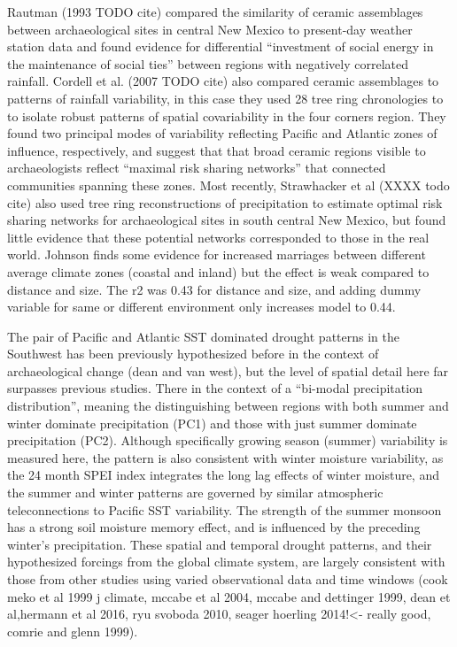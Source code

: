 \documentclass[11pt]{wlscirep}
\begin{document}
Rautman (1993 TODO cite) compared the similarity of ceramic assemblages between archaeological sites in central New Mexico to present-day weather station data and found evidence for differential ``investment of social energy in the maintenance of social ties'' between regions with negatively correlated rainfall. Cordell et al. (2007 TODO cite) also compared ceramic assemblages to patterns of rainfall variability, in this case they used 28 tree ring chronologies to to isolate robust patterns of spatial covariability in the four corners region. They found two principal modes of variability reflecting Pacific and Atlantic zones of influence, respectively, and suggest that that broad ceramic regions visible to archaeologists reflect ``maximal risk sharing networks'' that connected communities spanning these zones. Most recently, Strawhacker et al (XXXX todo cite) also used tree ring reconstructions of precipitation to estimate optimal risk sharing networks for archaeological sites in south central New Mexico, but found little evidence that these potential networks corresponded to those in the real world. Johnson finds some evidence for increased marriages between different average climate zones (coastal and inland) but the effect is weak compared to distance and  size. The r2 was 0.43 for distance and size, and adding dummy variable for same or different environment only increases model to 0.44.

The pair of Pacific and Atlantic SST dominated drought patterns in the Southwest has been previously hypothesized before in the context of archaeological change (dean and van west), but the level of spatial detail here far surpasses previous studies. There in the context of a ``bi-modal precipitation distribution'', meaning the distinguishing between regions with both summer and winter dominate precipitation (PC1) and those with just summer dominate precipitation (PC2). Although specifically growing season (summer) variability is measured here, the pattern is also consistent with winter moisture variability, as the 24 month SPEI index integrates the long lag effects of winter moisture, and the summer and winter patterns are governed by similar atmospheric teleconnections to Pacific SST variability. The strength of the summer monsoon has a strong soil moisture memory effect, and is influenced by the preceding winter's precipitation. These spatial and temporal drought patterns, and their hypothesized forcings from the global climate system, are largely consistent with those from other studies using varied observational data and time windows (cook meko et al 1999 j climate, mccabe et al 2004, mccabe and dettinger 1999, dean et al,hermann et al 2016, ryu svoboda 2010, seager hoerling 2014!<- really good, comrie and glenn 1999).
\end{document}

